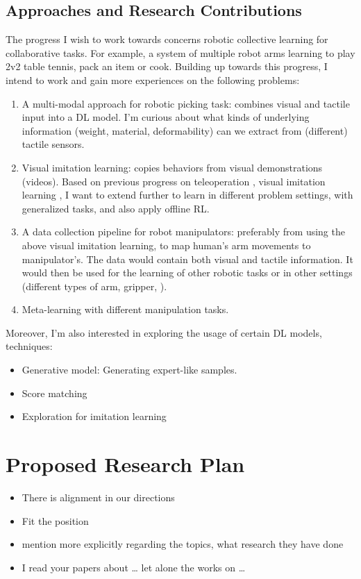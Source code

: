 \subsection{Approaches and Research Contributions}
The progress I wish to work towards concerns robotic collective learning for collaborative tasks. For example, a system of multiple robot arms learning to play 2v2 table tennis, pack an item or cook. Building up towards this progress, I intend to work and gain more experiences on the following problems:

\begin{enumerate}
	\item A multi-modal approach for robotic picking task: combines visual and tactile input into a \ac{DL} model. I'm curious about what kinds of underlying information (weight, material, deformability) can we extract from (different) tactile sensors.
	\item Visual imitation learning: copies behaviors from visual demonstrations (videos). Based on previous progress on teleoperation \cite{handa2020dexpilot}, visual imitation learning \cite{finn2017one, sharma2019third}, I want to extend further to learn in different problem settings, with generalized tasks, and also apply offline \ac{RL}.
	\item A data collection pipeline for robot manipulators: preferably from using the above visual imitation learning, to map human’s arm movements to manipulator's. The data would contain both visual and tactile information. It would then be used for the learning of other robotic tasks or in other settings (different types of arm, gripper, \etc).
	\item Meta-learning with different manipulation tasks.
\end{enumerate}

Moreover, I'm also interested in exploring the usage of certain \ac{DL} models, techniques:
\begin{itemize}
	\item Generative model: Generating expert-like samples.
	\item Score matching
	\item Exploration for imitation learning
\end{itemize}

\section{Proposed Research Plan}

\todo{}

\begin{itemize}
	\item There is alignment in our directions
	\item Fit the position
\end{itemize}

\begin{itemize}
	\item mention more explicitly regarding the topics, what research they have done
	\item I read your papers about … let alone the works on …
\end{itemize}
